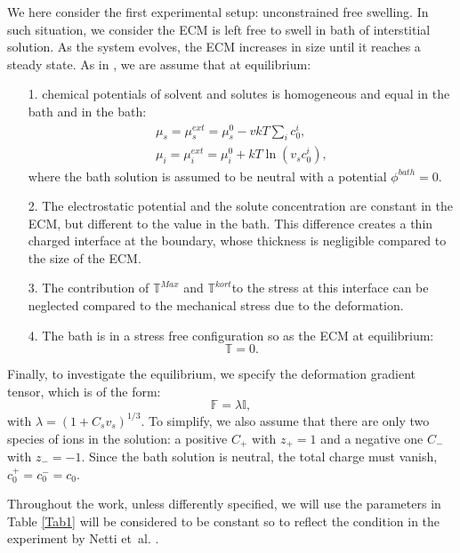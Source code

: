 \documentclass[runningheads]{llncs}
\newcommand{\F}{\ensuremath{\mathbb{F}}}
\begin{document}
We here consider the first experimental setup: unconstrained free swelling. In such situation, we consider the ECM is left free to swell in bath of interstitial solution. As the system evolves, the ECM increases in size until it reaches a steady state. As in \cite{DROZDOVph}, we are assume that at equilibrium:
\begin{itemize}
	\item[1.] chemical potentials of solvent and solutes is homogeneous and equal in the bath and in the bath:
	\begin{eqnarray}
	\mu_s=\mu^{ext}_s = \mu^0_s - vkT \sum_i c^i_0 ,\\\label{free1}
	\mu_i=\mu^{ext}_i = \mu^0_i +kT\ln(v_sc^i_0),
	\end{eqnarray} 
	where the bath solution is assumed to be neutral with a potential $\phi^{bath}=0$.
	\item[2.] The electrostatic potential and the solute concentration are constant in the ECM, but different to the value in the bath. This difference creates a thin charged interface at the boundary, whose thickness is negligible compared to the size of the ECM.
	\item[3.] The contribution of $\mathbb{T}^{Max}$ and $\mathbb{T}^{kort}$to the stress at this interface can be neglected compared to the mechanical stress due to the deformation. 
	\item[4.] The bath is in a stress free configuration so as the ECM at equilibrium:
	\begin{equation}
	\mathbb{T}=0.\label{free2}
	\end{equation} 
\end{itemize}

Finally, to investigate the equilibrium, we specify the deformation gradient tensor, which is of the form:
\begin{equation}
\F= \lambda \mathbb{I},\label{deffree}                                                                
\end{equation}
with $\lambda=(1+C_s v_s)^{1/3}$. To simplify, we also assume that there are only two species of ions in the solution: a positive $C_+$ with $z_+=1$ and a negative one $C_-$ with $z_-=-1$. Since the bath solution is neutral, the total charge must vanish, $c^+_0=c^-_0=c_0$.

Throughout the work, unless differently specified, we will use the parameters in Table \ref{Tab1} will be considered to be constant so to reflect the condition in the experiment by Netti et~al. \cite{Netti,ecm2}.
\end{document}

